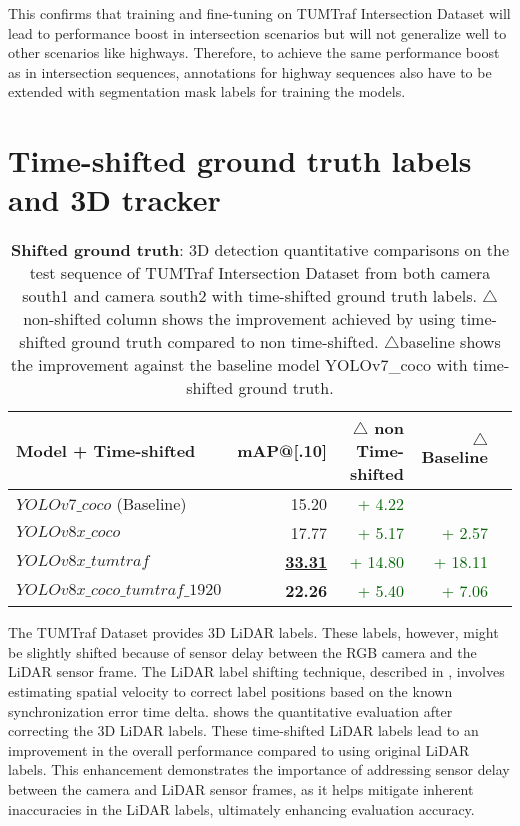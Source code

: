 This confirms that training and fine-tuning on TUMTraf Intersection Dataset will lead to performance boost in intersection scenarios but will not generalize well to other scenarios like highways. Therefore, to achieve the same performance boost as in intersection sequences, annotations for highway sequences also have to be extended with segmentation mask labels for training the models.

\section{Time-shifted ground truth labels and 3D tracker}

\begin{table}[htb]%
	\centering
	\begin{tabular}[htb]{lrrrr}
		\toprule
		\textbf{Model + Time-shifted} & \textbf{mAP@[.10]} & \textbf{$\triangle$ non Time-shifted}& \textbf{$\triangle$ Baseline} \\
		\midrule
		$YOLOv7\_coco$ (Baseline) & 15.20 & \textcolor{darkgreen}{+ 4.22} & \\
		$YOLOv8x\_coco$ & 17.77 & \textcolor{darkgreen}{+ 5.17} & \textcolor{darkgreen}{+ 2.57}  \\
		$YOLOv8x\_tumtraf$ & \underline{\textbf{33.31}} & \textcolor{darkgreen}{+ 14.80} & \textcolor{darkgreen}{+ 18.11}\\
		$YOLOv8x\_coco\_tumtraf\_1920$ & \textbf{22.26} & \textcolor{darkgreen}{+ 5.40} & \textcolor{darkgreen}{+ 7.06}\\
		\midrule
	\end{tabular}
	\caption{\textbf{Shifted ground truth}: 3D detection quantitative comparisons on the test sequence of TUMTraf Intersection Dataset from both camera south1 and camera south2 with time-shifted ground truth labels. $\triangle$non-shifted column shows the improvement achieved by using time-shifted ground truth compared to non time-shifted. $\triangle$baseline shows the improvement against the baseline model YOLOv7\_coco with time-shifted ground truth.}
	\label{tab:shifted_labels}
\end{table}

The TUMTraf Dataset provides 3D LiDAR labels. These labels, however, might be slightly shifted because of sensor delay between the RGB camera and the LiDAR sensor frame. The LiDAR label shifting technique, described in \cite{thesisJoseph}, involves estimating spatial velocity to correct label positions based on the known synchronization error time delta.  shows the quantitative evaluation after correcting the 3D LiDAR labels. These time-shifted LiDAR labels lead to an improvement in the overall performance compared to using original LiDAR labels. This enhancement demonstrates the importance of addressing sensor delay between the camera and LiDAR sensor frames, as it helps mitigate inherent inaccuracies in the LiDAR labels, ultimately enhancing evaluation accuracy.

